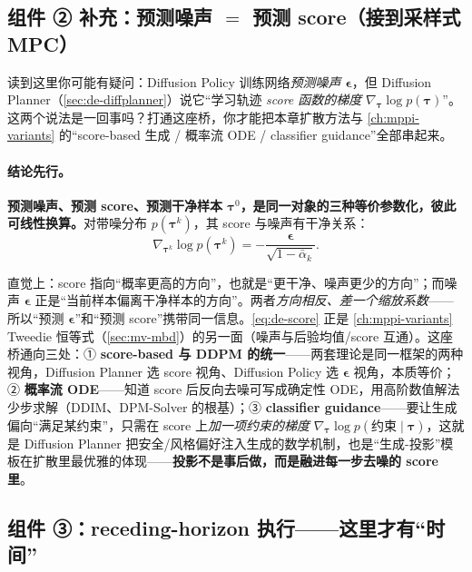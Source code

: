 \subsection{组件 ② 补充：预测噪声 \texorpdfstring{$=$}{=} 预测 score（接到采样式 MPC）}
\label{sec:de-score}

读到这里你可能有疑问：Diffusion Policy 训练网络\emph{预测噪声 $\boldsymbol{\epsilon}$}，但 Diffusion Planner（\cref{sec:de-diffplanner}）说它“学习轨迹 \emph{score 函数的梯度} $\nabla_{\boldsymbol{\tau}}\log p(\boldsymbol{\tau})$”。这两个说法是一回事吗？打通这座桥，你才能把本章扩散方法与 \cref{ch:mppi-variants} 的“score-based 生成 / 概率流 ODE / classifier guidance”全部串起来。

\paragraph{结论先行。}
\textbf{预测噪声、预测 score、预测干净样本 $\boldsymbol{\tau}^0$，是同一对象的三种等价参数化，彼此可线性换算。}对带噪分布 $p(\boldsymbol{\tau}^k)$，其 score 与噪声有干净关系：
\begin{equation}
  \nabla_{\boldsymbol{\tau}^k}\log p(\boldsymbol{\tau}^k)=-\frac{\boldsymbol{\epsilon}}{\sqrt{1-\bar\alpha_k}}.
  \label{eq:de-score}
\end{equation}

\begin{insight}[“噪声 $=$ 负的 score $\times$ 系数”一旦看穿，三篇扩散工作合为一体]
直觉上：score 指向“概率更高的方向”，也就是“更干净、噪声更少的方向”；而噪声 $\boldsymbol{\epsilon}$ 正是“当前样本偏离干净样本的方向”。两者\emph{方向相反、差一个缩放系数}——所以“预测 $\boldsymbol{\epsilon}$”和“预测 score”携带同一信息。\cref{eq:de-score} 正是 \cref{ch:mppi-variants} Tweedie 恒等式（\cref{sec:mv-mbd}）的另一面（噪声与后验均值/score 互通）。这座桥通向三处：① \textbf{score-based 与 DDPM 的统一}\cite{song2019score}——两套理论是同一框架的两种视角，Diffusion Planner 选 score 视角、Diffusion Policy 选 $\boldsymbol{\epsilon}$ 视角，本质等价；② \textbf{概率流 ODE}——知道 score 后反向去噪可写成确定性 ODE，用高阶数值解法少步求解（DDIM、DPM-Solver 的根基）；③ \textbf{classifier guidance}——要让生成偏向“满足某约束”，只需在 score 上\emph{加一项约束的梯度} $\nabla_{\boldsymbol{\tau}}\log p(\text{约束}\mid\boldsymbol{\tau})$，这就是 Diffusion Planner 把安全/风格偏好注入生成的数学机制，也是“生成-投影”模板在扩散里最优雅的体现——\textbf{投影不是事后做，而是融进每一步去噪的 score 里}。
\end{insight}

\subsection{组件 ③：receding-horizon 执行——这里才有“时间”}
\label{sec:de-receding}

